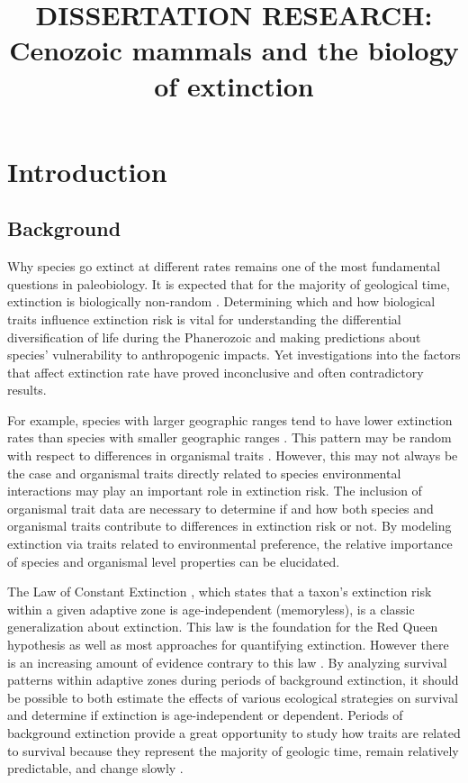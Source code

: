 \documentclass[11pt,letterpaper]{article}
\title{\uppercase{Dissertation Research:}\\ Cenozoic mammals and the biology of extinction\vspace{-3ex}}
\date{}
\begin{document}

\setcounter{secnumdepth}{0}

\maketitle
\section{Introduction}
\subsection{Background}
Why species go extinct at different rates remains one of the most fundamental questions in paleobiology. It is expected that for the majority of geological time, extinction is biologically non-random \citep{Jablonski1986,Alexander1977,Harnik2011,Johnson2002b,Kitchell1986,Nurnberg2013a,Payne2007}. Determining which and how biological traits influence extinction risk is vital for understanding the differential diversification of life during the Phanerozoic and making predictions about species' vulnerability to anthropogenic impacts. Yet investigations into the factors that affect extinction rate have proved inconclusive and often contradictory results.

For example, species with larger geographic ranges tend to have lower extinction rates than species with smaller geographic ranges \citep{Jablonski1986,Harnik2013,Nurnberg2013a,Jablonski2003,Roy2009c}. This pattern may be random with respect to differences in organismal traits \citep{Raup1991b}. However, this may not always be the case and organismal traits directly related to species environmental interactions may play an important role in extinction risk.  The inclusion of organismal trait data are necessary to determine if and how both species and organismal traits contribute to differences in extinction risk or not. By modeling extinction via traits related to environmental preference, the relative importance of species and organismal level properties can be elucidated.

The Law of Constant Extinction \citep{VanValen1973}, which states that a taxon's extinction risk within a given adaptive zone is age-independent (memoryless), is a classic generalization about extinction. This law is the foundation for the Red Queen hypothesis as well as most approaches for quantifying extinction. However there is an increasing amount of evidence contrary to this law \citep{Drake2014,Raup1975,Sepkoski1975,Finnegan2008}. By analyzing survival patterns within adaptive zones during periods of background extinction, it should be possible to both estimate the effects of various ecological strategies on survival and determine if extinction is age-independent or dependent. Periods of background extinction provide a great opportunity to study how traits are related to survival because they represent the majority of geologic time, remain relatively predictable, and change slowly \citep{Jablonski1986,Raup1988}. 
\end{document}
